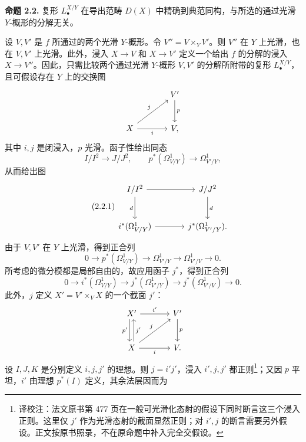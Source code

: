\textbf{命题 2.2.} 复形 $L^{X/Y}_\bullet$ 在导出范畴 $D(X)$ 中精确到典范同构，与所选的通过光滑 $Y$-概形的分解无关。

设 $V,V'$ 是 $f$ 所通过的两个光滑 $Y$-概形。令 $V''=V\times_Y V'$。则 $V''$ 在 $Y$ 上光滑，也在 $V,V'$ 上光滑。此外，浸入 $X\to V$ 和 $X\to V'$ 定义一个给出 $f$ 的分解的浸入 $X\to V''$。因此，只需比较两个通过光滑 $Y$-概形 $V,V'$ 的分解所附带的复形 $L^{X/Y}_\bullet$，且可假设存在 $Y$ 上的交换图
\[
\begin{tikzcd}[column sep=large,row sep=large]
& V' \arrow[d,"p"]\\
X \arrow[ur,"j"] \arrow[r,"i"'] & V,
\end{tikzcd}
\]
其中 $i,j$ 是闭浸入，$p$ 光滑。函子性给出同态
\[
I/I^2\longrightarrow J/J^2,
\qquad
p^*(\Omega^1_{V/Y})\longrightarrow\Omega^1_{V'/Y},
\]
从而给出图
\begin{equation}\tag{2.2.1}
\begin{tikzcd}[column sep=large,row sep=large]
I/I^2 \arrow[r] \arrow[d,"d"'] & J/J^2 \arrow[d,"d"]\\
i^*(\Omega^1_{V/Y}) \arrow[r] & j^*(\Omega^1_{V'/Y}).
\end{tikzcd}
\end{equation}
由于 $V,V'$ 在 $Y$ 上光滑，得到正合列
\[
0\longrightarrow p^*(\Omega^1_{V/Y})\longrightarrow\Omega^1_{V'/Y}
\longrightarrow\Omega^1_{V'/V}\longrightarrow0.
\]
所考虑的微分模都是局部自由的，故应用函子 $j^*$，得到正合列
\begin{equation}\tag{2.2.2}
0\longrightarrow i^*(\Omega^1_{V/Y})\longrightarrow j^*(\Omega^1_{V'/Y})
\longrightarrow j^*(\Omega^1_{V'/V})\longrightarrow0.
\end{equation}
此外，$j$ 定义 $X'=V'\times_V X$ 的一个截面 $j'$：
\[
\begin{tikzcd}[column sep=large,row sep=large]
X' \arrow[r,"i'"] \arrow[d,shift right=.6ex,"p'"'] & V' \arrow[d,"p"]\\
X \arrow[u,shift right=.6ex,"j'"'] \arrow[r,"i"'] \arrow[ur,"j"] & V .
\end{tikzcd}
\]
设 $I,J,K$ 是分别定义 $i,j,j'$ 的理想。则 $j=i'j'$，浸入 $i',j,j'$ 都正则\footnote{译校注：法文原书第 477 页在一般可光滑化态射的假设下同时断言这三个浸入正则。这里仅 $j'$ 作为光滑态射的截面显然正则；对 $i',j$ 的断言需要另外假设。正文按原书照录，不在原命题中补入完全交假设。}；又因 $p$ 平坦，$i'$ 由理想 $p^*(I)$ 定义，其余法层因而为
